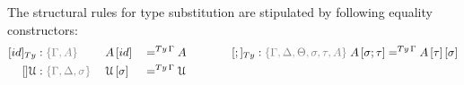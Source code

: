 \documentclass[a4paper,UKenglish,numberwithinsect,cleveref,thm-restate]{lipics-v2021}
\begin{document}
The structural rules for type substitution are stipulated by following equality constructors:
\begin{alignat*}{9}
  [\idS]_{\Ty} &: \implicit{\Gamma, A} \; && \sub{A}{\idS} && =^{\Ty\,\Gamma} A
  \qquad\qquad
  [;]_{\Ty}  : \implicit{\Gamma, \Delta, \Theta, \sigma, \tau, A}\; \sub{A}{\sigma ; \tau} =^{\Ty\,\Gamma} \sub{\sub{A}{\tau}}{\sigma}
  \\
  []\UU &: \implicit{\Gamma, \Delta, \sigma} \; && \sub{\UU}{\sigma} && =^{\Ty\,\Gamma} \UU
\end{alignat*}
%
\end{document}
